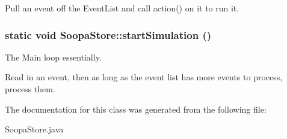 Pull an event off the EventList and call action() on it to run it. 

\hypertarget{class_soopa_store_0aad33c6987dcb01206d9dca916b8f6e}{
\subsubsection[{startSimulation}]{\setlength{\rightskip}{0pt plus 5cm}static void SoopaStore::startSimulation ()}}
\label{class_soopa_store_0aad33c6987dcb01206d9dca916b8f6e}


The Main loop essentially. 

Read in an event, then as long as the event list has more events to process, process them. 

The documentation for this class was generated from the following file:\begin{CompactItemize}
\item 
SoopaStore.java\end{CompactItemize}
